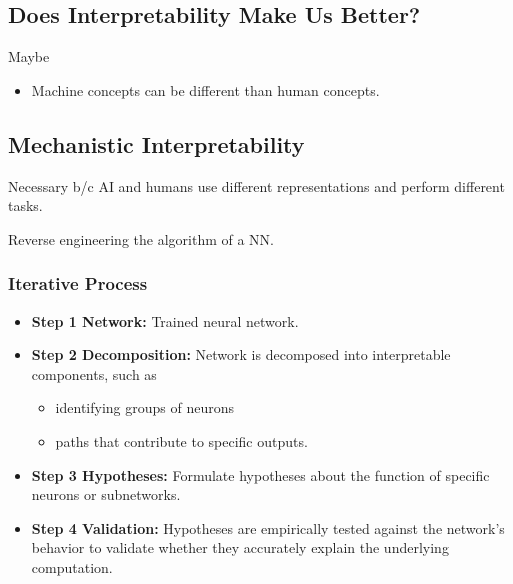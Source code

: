 \subsection{Does Interpretability Make Us Better?}
\begin{notes}
    Maybe
    \begin{itemize}
        \item Machine concepts can be different than human concepts. 
    \end{itemize}
\end{notes}

\subsection{Mechanistic Interpretability}
\begin{motivation}
    Necessary b/c AI and humans use different representations and perform different tasks. 
\end{motivation}
\begin{definition}
    Reverse engineering the algorithm of a NN.
\end{definition}

\subsubsection{Iterative Process}
\begin{notes}
    \begin{itemize}
        \item \textbf{Step 1 Network:} Trained neural network.
        \item \textbf{Step 2 Decomposition:} Network is decomposed into interpretable components, such as 
        \begin{itemize}
            \item identifying groups of neurons
            \item paths that contribute to specific outputs.
        \end{itemize}
        \item \textbf{Step 3 Hypotheses:} Formulate hypotheses about the function of specific neurons or subnetworks. 
        \item \textbf{Step 4 Validation:} Hypotheses are empirically tested against the network's behavior to validate whether they accurately explain the underlying computation.
    \end{itemize}    
\end{notes}

